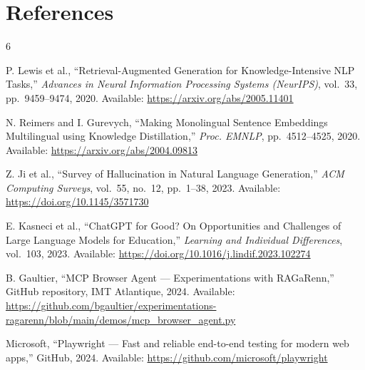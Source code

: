 \documentclass[12pt, a4paper]{article}
\begin{document}
\section*{References}
\renewcommand{\refname}{}
\begin{thebibliography}{6}

P. Lewis et al., ``Retrieval-Augmented Generation for Knowledge-Intensive NLP Tasks,'' \textit{Advances in Neural Information Processing Systems (NeurIPS)}, vol.~33, pp.~9459--9474, 2020. Available: \url{https://arxiv.org/abs/2005.11401}

N. Reimers and I. Gurevych, ``Making Monolingual Sentence Embeddings Multilingual using Knowledge Distillation,'' \textit{Proc. EMNLP}, pp.~4512--4525, 2020. Available: \url{https://arxiv.org/abs/2004.09813}

Z. Ji et al., ``Survey of Hallucination in Natural Language Generation,'' \textit{ACM Computing Surveys}, vol.~55, no.~12, pp.~1--38, 2023. Available: \url{https://doi.org/10.1145/3571730}

E. Kasneci et al., ``ChatGPT for Good? On Opportunities and Challenges of Large Language Models for Education,'' \textit{Learning and Individual Differences}, vol.~103, 2023. Available: \url{https://doi.org/10.1016/j.lindif.2023.102274}

B. Gaultier, ``MCP Browser Agent --- Experimentations with RAGaRenn,''
GitHub repository, IMT Atlantique, 2024. Available:
\url{https://github.com/bgaultier/experimentations-ragarenn/blob/main/demos/mcp_browser_agent.py}

Microsoft, ``Playwright --- Fast and reliable end-to-end testing for modern web apps,'' GitHub, 2024. Available: \url{https://github.com/microsoft/playwright}

\end{thebibliography}
\end{document}
